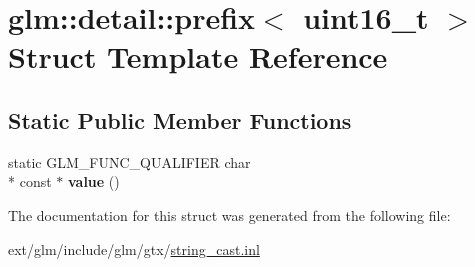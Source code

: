 \hypertarget{structglm_1_1detail_1_1prefix_3_01uint16__t_01_4}{\section{glm\-:\-:detail\-:\-:prefix$<$ uint16\-\_\-t $>$ Struct Template Reference}
\label{structglm_1_1detail_1_1prefix_3_01uint16__t_01_4}
}
\subsection*{Static Public Member Functions}
\begin{DoxyCompactItemize}
\item 
\hypertarget{structglm_1_1detail_1_1prefix_3_01uint16__t_01_4_a9546e8aaf707c3f0028c8da94f6c06da}{static G\-L\-M\-\_\-\-F\-U\-N\-C\-\_\-\-Q\-U\-A\-L\-I\-F\-I\-E\-R char \\*
const $\ast$ {\bfseries value} ()}\label{structglm_1_1detail_1_1prefix_3_01uint16__t_01_4_a9546e8aaf707c3f0028c8da94f6c06da}

\end{DoxyCompactItemize}


The documentation for this struct was generated from the following file\-:\begin{DoxyCompactItemize}
\item 
ext/glm/include/glm/gtx/\hyperlink{string__cast_8inl}{string\-\_\-cast.\-inl}\end{DoxyCompactItemize}
